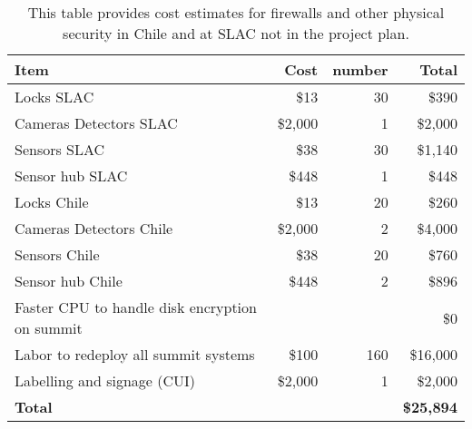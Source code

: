 \tiny \begin{longtable} {|p{}|r|r|r|} \caption{This table provides cost estimates for firewalls and other physical security in Chile and at SLAC not in the project plan. \label{tab:firewalls}}\\ 
\hline 
\textbf{Item}&\textbf{Cost}&\textbf{number}&\textbf{Total} \\ \hline
{Locks SLAC}&{\$13}&{30}&{\$390} \\ \hline
{Cameras Detectors  SLAC}&{\$2,000}&{1}&{\$2,000} \\ \hline
{Sensors SLAC}&{\$38}&{30}&{\$1,140} \\ \hline
{Sensor hub SLAC}&{\$448}&{1}&{\$448} \\ \hline
{Locks Chile}&{\$13}&{20}&{\$260} \\ \hline
{Cameras Detectors Chile}&{\$2,000}&{2}&{\$4,000} \\ \hline
{Sensors Chile}&{\$38}&{20}&{\$760} \\ \hline
{Sensor hub Chile}&{\$448}&{2}&{\$896} \\ \hline
{Faster CPU to handle disk encryption on summit}&{}&{}&{\$0} \\ \hline
{Labor to redeploy all summit systems}&{\$100}&{160}&{\$16,000} \\ \hline
{Labelling and signage (CUI)}&{\$2,000}&{1}&{\$2,000} \\ \hline
\textbf{Total }&\textbf{}&\textbf{}&\textbf{\$25,894} \\ \hline
\end{longtable} \normalsize
